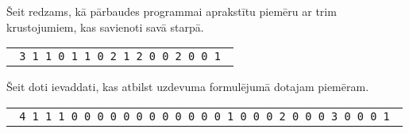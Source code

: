 \documentclass{boi2014-lv}
\begin{document}
	Šeit redzams, kā pārbaudes programmai aprakstītu piemēru ar trim krustojumiem, kas savienoti savā starpā.
	

    \begin{center}
        \begin{tabular}{p{4cm}}
            {\tt
                3 \newline
                0 1 1 \newline
                1 0 1 \newline
                1 1 0 \newline
                1 \newline
                0 2 1 2 \newline
                2 0 0 2 \newline
                1 0 0 1 \newline
            }
        \end{tabular}
    \end{center}

	Šeit doti ievaddati, kas atbilst uzdevuma formulējumā dotajam piemēram.

    \begin{center}
        \begin{tabular}{p{4cm}}
            {\tt
                4 \newline
                0 1 1 1 \newline
                1 0 0 0 \newline
                1 0 0 0 \newline
                1 0 0 0 \newline
                1 \newline
                0 0 0 0 1 \newline
                2 0 0 0 2 \newline
                3 0 0 0 3 \newline
                1 0 0 0 1 \newline
            }
        \end{tabular}
    \end{center}
\end{document}
